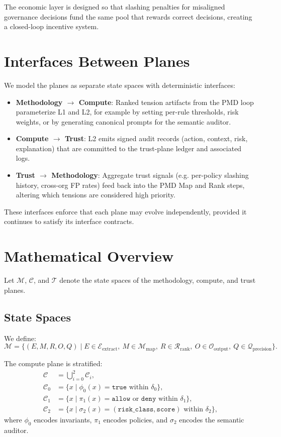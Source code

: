 \documentclass[11pt]{article}
\begin{document}
The economic layer is designed so that slashing penalties for misaligned governance decisions fund the same pool that rewards correct decisions, creating a closed-loop incentive system.

\section{Interfaces Between Planes}

We model the planes as separate state spaces with deterministic interfaces:

\begin{itemize}
  \item \textbf{Methodology \(\rightarrow\) Compute}: Ranked tension artifacts from the PMD loop parameterize L1 and L2, for example by setting per-rule thresholds, risk weights, or by generating canonical prompts for the semantic auditor.
  \item \textbf{Compute \(\rightarrow\) Trust}: L2 emits signed audit records (action, context, risk, explanation) that are committed to the trust-plane ledger and associated logs.
  \item \textbf{Trust \(\rightarrow\) Methodology}: Aggregate trust signals (e.g. per-policy slashing history, cross-org FP rates) feed back into the PMD Map and Rank steps, altering which tensions are considered high priority.
\end{itemize}

These interfaces enforce that each plane may evolve independently, provided it continues to satisfy its interface contracts.

\section{Mathematical Overview}

Let \(\mathcal{M}\), \(\mathcal{C}\), and \(\mathcal{T}\) denote the state spaces of the methodology, compute, and trust planes.

\subsection{State Spaces}

We define:
\[
\mathcal{M} = \{ (E,M,R,O,Q) \mid E \in \mathcal{E}_{\mathrm{extract}},\ M \in \mathcal{M}_{\mathrm{map}},\ R \in \mathcal{R}_{\mathrm{rank}},\ O \in \mathcal{O}_{\mathrm{output}},\ Q \in \mathcal{Q}_{\mathrm{precision}} \}.
\]

The compute plane is stratified:
\begin{align}
\mathcal{C} &= \bigcup_{i=0}^{2} \mathcal{C}_i, \\
\mathcal{C}_0 &= \{ x \mid \phi_0(x) = \texttt{true} \text{ within } \delta_0 \}, \\
\mathcal{C}_1 &= \{ x \mid \pi_1(x) = \texttt{allow} \text{ or } \texttt{deny} \text{ within } \delta_1 \}, \\
\mathcal{C}_2 &= \{ x \mid \sigma_2(x) = (\texttt{risk\_class}, \texttt{score}) \text{ within } \delta_2 \},
\end{align}
where \(\phi_0\) encodes invariants, \(\pi_1\) encodes policies, and \(\sigma_2\) encodes the semantic auditor.
\end{document}
